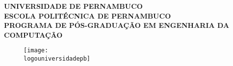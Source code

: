 \documentclass[
    a4paper,        %
    12pt,           %
    oneside,        %
    openright,      %
    final,          %
    sumario=tradicional, %
    english,        %
    french,         %
    spanish,        %
    brazil          %
    ]{abntex2}
\def\universidade{Universidade de Pernambuco}
\def\logouniversidadepb{img/logo/logo-UPE-PB.png}
\def\centro{Escola Politécnica de Pernambuco}
\def\programa{Programa de Pós-Graduação em Engenharia da Computação}
\begin{document}
%     
\renewcommand{\imprimircapa}{
  \begin{capa}
    \center{}
    {\textbf{\MakeUppercase{\universidade}}}\\
    \vspace{0.25\onelineskip}
    {\textbf{\MakeUppercase{\centro}}}\\
    \vspace{0.25\onelineskip}
    {\textbf{\MakeUppercase{\programa}}}\\

    \vspace*{\fill}
    \begin{figure}[!h]
      \centering
        \texttt{[image: \\logouniversidadepb]}
    \end{figure}

    \vspace{0.5\onelineskip}
    {\textbf{\MakeUppercase{\imprimirtipotrabalho}}}\\
    \vspace{0.5\onelineskip}
    {\textbf{\imprimirtitulo}}\\
    \vspace*{\fill}
    {\textbf{\imprimirautor}}
  \end{capa}
  }
\imprimircapa{}
\end{document}
